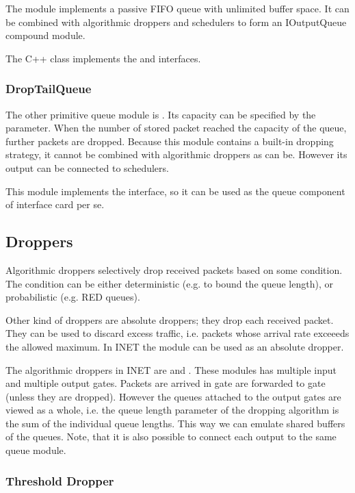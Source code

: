 The  module implements a passive
FIFO queue with unlimited buffer space. It can be combined
with algorithmic droppers and schedulers to form an
IOutputQueue compound module.

The C++ class implements the  and
 interfaces.

\subsubsection{DropTailQueue}

The other primitive queue module is .
Its capacity can be specified by the 
parameter. When the number of stored packet reached the capacity
of the queue, further packets are dropped.
Because this module contains a built-in dropping strategy, it
cannot be combined with algorithmic droppers as 
can be. However its output can be connected to schedulers.

This module implements the  interface,
so it can be used as the queue component of interface card per se.

\subsection{Droppers}

Algorithmic droppers selectively drop received packets based on some condition.
The condition can be either deterministic (e.g. to bound the queue length),
or probabilistic (e.g. RED queues).

Other kind of droppers are absolute droppers; they drop each received
packet. They can be used to discard excess traffic, i.e. packets whose
arrival rate exceeeds the allowed maximum. In INET the 
module can be used as an absolute dropper.

The algorithmic droppers in INET are  and
. These modules has multiple input and multiple
output gates. Packets are arrived in gate  are forwarded
to gate  (unless they are dropped). However the queues
attached to the output gates are viewed as a whole, i.e. the queue
length parameter of the dropping algorithm is the sum of the individual
queue lengths. This way we can emulate shared buffers of the queues.
Note, that it is also possible to connect each output to the same
queue module.

\subsubsection{Threshold Dropper}

